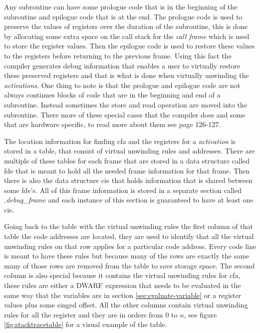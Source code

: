 Any subroutine can have some prologue code that is in the beginning of the subroutine  and epilogue code that is at the end.
The prologue code is used to preserve the values of registers over the duration of the subroutine, this is done by allocating some extra space on the call stack for the \emph{call frame} which is used to store the register values.
Then the epilogue code is used to restore these values to the registers before returning to the previous frame.
Using this fact the compiler generates debug information that enables a user to virtually restore these preserved registers and that is what is done when virtually unwinding the \emph{activations}.
One thing to note is that the prologue and epilogue code are not always continues blocks of code that are in the beginning and end of a subroutine.
Instead sometimes the store and read operation are moved into the subroutine.
There more of these special cases that the compiler does and some that are hardware specific, to read more about them see \cite{dwarf} page 126-127.


The location information for finding \gls{cfa} and the registers for a \emph{activation} is stored in a table, that consist of virtual unwinding rules and addresses.
There are multiple of these tables for each frame that are stored in a data structure called \gls{fde} that is meant to hold all the needed frame information for that frame.
Then there is also the data structure \gls{cie} that holds information that is shared between some \acrlong{fde}'s.
All of this frame information is stored in a separate section called \emph{.debug\_frame} and each instance of this section is guaranteed to have at least one \acrlong{cie}.


Going back to the table with the virtual unwinding rules the first column of that table the code addresses are located, they are used to identify that all the virtual unwinding rules on that row applies for a particular code address.
Every code line is meant to have these rules but because many of the rows are exactly the same many of those rows are removed from the table to save storage space.
The second column is also special because it contains the virtual unwinding rules for \gls{cfa}, these rules are either a \gls{DWARF} expression that needs to be evaluated in the same way that the variables are in section \ref{sec:evaluate-variable} or a register values plus some singed offset.
All the other columns contain virtual unwinding rules for all the register and they are in orders from $0$ to $n$, see figure \ref{fig:stacktracetable} for a visual example of the table.


